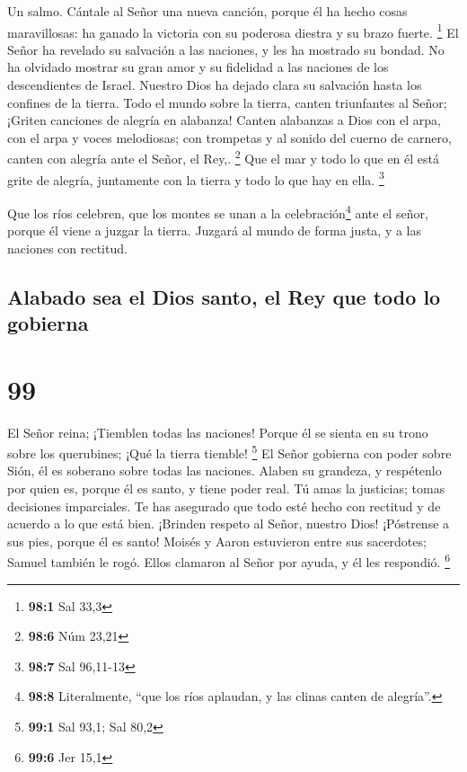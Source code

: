 Un salmo.  Cántale al Señor una nueva canción, porque él
ha hecho cosas maravillosas: ha ganado la victoria con su poderosa
diestra y su brazo fuerte. \footnote{\textbf{98:1} Sal 33,3}
 El Señor ha revelado su salvación a las naciones, y les
ha mostrado su bondad.  No ha olvidado mostrar su gran
amor y su fidelidad a las naciones de los descendientes de Israel.
Nuestro Dios ha dejado clara su salvación hasta los confines de la
tierra.  Todo el mundo sobre la tierra, canten triunfantes
al Señor; ¡Griten canciones de alegría en alabanza! 
Canten alabanzas a Dios con el arpa, con el arpa y voces melodiosas;
 con trompetas y al sonido del cuerno de carnero, canten
con alegría ante el Señor, el Rey,. \footnote{\textbf{98:6} Núm 23,21}
 Que el mar y todo lo que en él está grite de alegría,
juntamente con la tierra y todo lo que hay en ella. \footnote{\textbf{98:7}
  Sal 96,11-13}

 Que los ríos celebren, que los montes se unan a la
celebración\footnote{\textbf{98:8} Literalmente, ``que los ríos
  aplaudan, y las clinas canten de alegría''.}  ante el
señor, porque él viene a juzgar la tierra. Juzgará al mundo de forma
justa, y a las naciones con rectitud.

\hypertarget{alabado-sea-el-dios-santo-el-rey-que-todo-lo-gobierna}{%
\subsection{Alabado sea el Dios santo, el Rey que todo lo
gobierna}\label{alabado-sea-el-dios-santo-el-rey-que-todo-lo-gobierna}}

\hypertarget{section-98}{%
\section{99}\label{section-98}}

 El Señor reina; ¡Tiemblen todas las naciones! Porque él
se sienta en su trono sobre los querubines; ¡Qué la tierra tiemble!
\footnote{\textbf{99:1} Sal 93,1; Sal 80,2}  El Señor
gobierna con poder sobre Sión, él es soberano sobre todas las naciones.
 Alaben su grandeza, y respétenlo por quien es, porque él
es santo,  y tiene poder real. Tú amas la justicias; tomas
decisiones imparciales. Te has asegurado que todo esté hecho con
rectitud y de acuerdo a lo que está bien.  ¡Brinden
respeto al Señor, nuestro Dios! ¡Póstrense a sus pies, porque él es
santo!  Moisés y Aaron estuvieron entre sus sacerdotes;
Samuel también le rogó. Ellos clamaron al Señor por ayuda, y él les
respondió. \footnote{\textbf{99:6} Jer 15,1}

